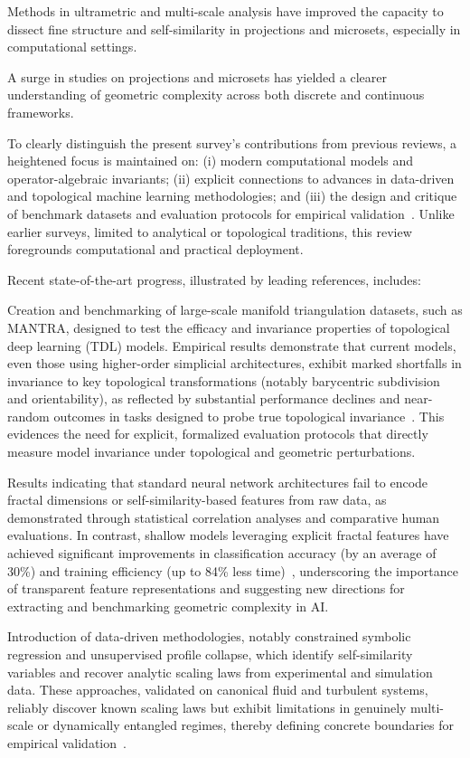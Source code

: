 \documentclass[sigconf]{acmart}
\begin{document}
Methods in ultrametric and multi-scale analysis have improved the capacity to dissect fine structure and self-similarity in projections and microsets, especially in computational settings.

A surge in studies on projections and microsets has yielded a clearer understanding of geometric complexity across both discrete and continuous frameworks.

To clearly distinguish the present survey's contributions from previous reviews, a heightened focus is maintained on: (i) modern computational models and operator-algebraic invariants; (ii) explicit connections to advances in data-driven and topological machine learning methodologies; and (iii) the design and critique of benchmark datasets and evaluation protocols for empirical validation~\cite{ref26,ref39,ref65}. Unlike earlier surveys, limited to analytical or topological traditions, this review foregrounds computational and practical deployment.

Recent state-of-the-art progress, illustrated by leading references, includes:

Creation and benchmarking of large-scale manifold triangulation datasets, such as MANTRA, designed to test the efficacy and invariance properties of topological deep learning (TDL) models. Empirical results demonstrate that current models, even those using higher-order simplicial architectures, exhibit marked shortfalls in invariance to key topological transformations (notably barycentric subdivision and orientability), as reflected by substantial performance declines and near-random outcomes in tasks designed to probe true topological invariance~\cite{ref26}. This evidences the need for explicit, formalized evaluation protocols that directly measure model invariance under topological and geometric perturbations.

Results indicating that standard neural network architectures fail to encode fractal dimensions or self-similarity-based features from raw data, as demonstrated through statistical correlation analyses and comparative human evaluations. In contrast, shallow models leveraging explicit fractal features have achieved significant improvements in classification accuracy (by an average of 30\%) and training efficiency (up to 84\% less time)~\cite{ref39}, underscoring the importance of transparent feature representations and suggesting new directions for extracting and benchmarking geometric complexity in AI.

Introduction of data-driven methodologies, notably constrained symbolic regression and unsupervised profile collapse, which identify self-similarity variables and recover analytic scaling laws from experimental and simulation data. These approaches, validated on canonical fluid and turbulent systems, reliably discover known scaling laws but exhibit limitations in genuinely multi-scale or dynamically entangled regimes, thereby defining concrete boundaries for empirical validation~\cite{ref65}.
\end{document}
